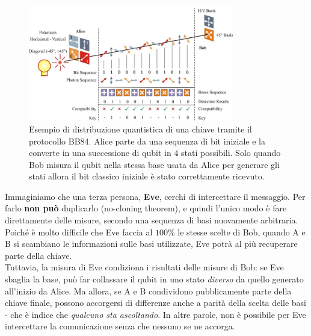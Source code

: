 \documentclass[../../InformazioneQuantistica.tex]{subfiles}
\begin{document}
\begin{figure}[H]
\centering
\includegraphics[width=0.8\textwidth]{Immagini/27_3/image005.png}
\caption{Esempio di distribuzione quantistica di una chiave tramite il protocollo BB84. Alice parte da una sequenza di bit iniziale e la converte in una successione di qubit in $4$ stati possibili. Solo quando Bob misura il qubit nella stessa base usata da Alice per generare gli stati allora il bit classico iniziale è stato correttamente ricevuto.\label{fig:quantum-bb84}}
\end{figure}

Immaginiamo che una terza persona, \textbf{Eve}, cerchi di intercettare il messaggio. Per farlo \textbf{non può} duplicarlo (no-cloning theorem), e quindi l'unico modo è fare direttamente delle misure, secondo una sequenza di basi nuovamente arbitraria. Poiché è molto difficile che Eve faccia al $100\%$ le stesse scelte di Bob, quando A e B si scambiano le informazioni sulle basi utilizzate, Eve potrà al più recuperare parte della chiave.\\
Tuttavia, la misura di Eve condiziona i risultati delle misure di Bob: se Eve sbaglia la base, può far collassare il qubit in uno stato \textit{diverso} da quello generato all'inizio da Alice. Ma allora, se A e B condividono pubblicamente parte della chiave finale, possono accorgersi di differenze anche a parità della scelta delle basi - che è indice che \textit{qualcuno sta ascoltando}. In altre parole, non è possibile per Eve intercettare la comunicazione senza che nessuno se ne accorga.\\
\end{document}
